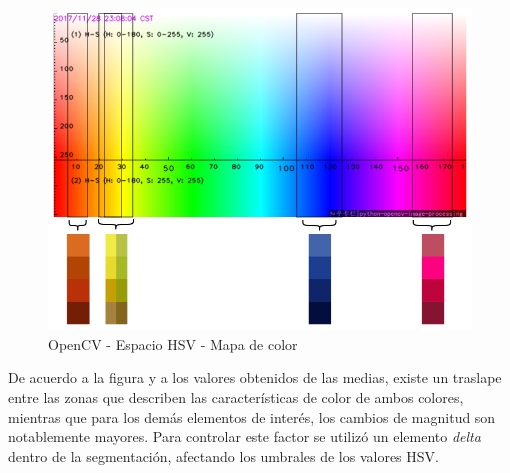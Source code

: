 \begin{figure}[H]
    \centering
    \includegraphics[scale=0.4]{Figures/PieceColors_HSVColorMap.png}
        \caption{OpenCV - Espacio HSV - Mapa de color \cite{pai_adityapai2398colour-segmentation--opencv_2022}}
        \label{fig:ColorMapHSVOpenCV}
\end{figure}

De acuerdo a la figura y a los valores obtenidos de las medias, existe un traslape entre las zonas que describen las características de color de ambos colores, mientras que para los demás elementos de interés, los cambios de magnitud son notablemente mayores. Para controlar este factor se utilizó un elemento \textit{delta} dentro de la segmentación, afectando los umbrales de los valores HSV.

